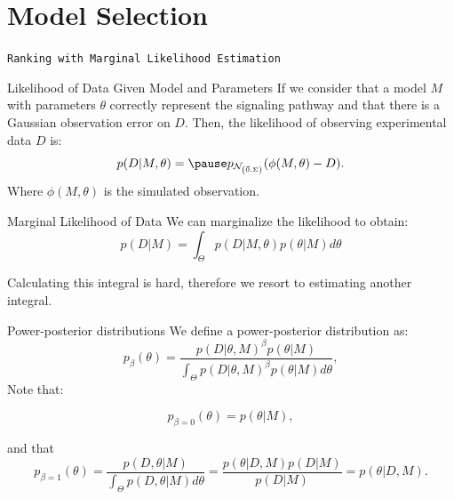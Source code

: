 \documentclass{beamer}
\begin{document}
\section{Model Selection}
\begin{frame}{}
\begin{center}
    \texttt{Ranking with Marginal Likelihood Estimation}
\end{center}
\end{frame}


\begin{frame}{Likelihood of Data Given Model and Parameters}
If we consider that a model $M$ with parameters $\theta$ correctly 
represent the signaling pathway \pause and that there is a Gaussian 
observation error on $D$.
\pause
Then, the likelihood of observing experimental data $D$ is:
\begin{equation*}
     p (D | M, \theta) = \pause 
        p_{\mathcal{N}_{\left(\vec{0}, \Sigma\right)}} 
            (\phi (M,\theta) - D).
\end{equation*}
Where $\phi (M, \theta)$ is the simulated observation.
\end{frame}


\begin{frame}{Marginal Likelihood of Data}
We can marginalize the likelihood to obtain:
\begin{equation*}
    p (D | M) = \int_{\Theta} p (D | M, \theta) p (\theta | M)d\theta
\end{equation*}

\pause
Calculating this integral is hard, therefore we resort to estimating
another integral.
\end{frame}


\begin{frame}{Power-posterior distributions}
We define a power-posterior distribution as:
\begin{equation*}
    p_{\beta} (\theta) = \frac{p (D | \theta, M)^\beta p(\theta | M)}
                    {\int_\Theta p (D | \theta, M)^\beta p(\theta | M) 
                    d\theta},
\end{equation*}
\pause
Note that:

\begin{equation*}
    p_{\beta=0} (\theta) = p (\theta | M),
\end{equation*}

\pause
and that
\begin{equation*}
    p_{\beta=1}(\theta) =\frac{p (D, \theta|M)}
                              {\int_\Theta p (D, \theta | M)d\theta}
                        =\frac{p(\theta | D, M) p(D|M)}{p (D | M)}
                        =p (\theta | D, M).
\end{equation*}
\end{frame}
\end{document}

